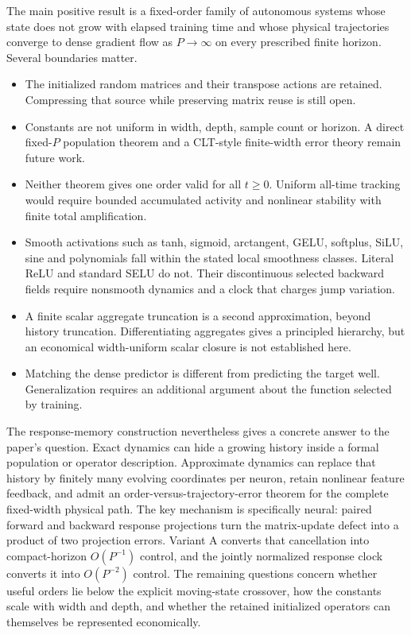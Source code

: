 \documentclass[11pt]{article}
\theoremstyle{definition}
\theoremstyle{remark}
\begin{document}
The main positive result is a fixed-order family of autonomous systems whose
state does not grow with elapsed training time and whose physical trajectories
converge to dense gradient flow as $P\to\infty$ on every prescribed finite
horizon.  Several boundaries matter.

\begin{itemize}
\item The initialized random matrices and their transpose actions are retained.
Compressing that source while preserving matrix reuse is still open.
\item Constants are not uniform in width, depth, sample count or horizon.  A
direct fixed-$P$ population theorem and a CLT-style finite-width error theory
remain future work.
\item Neither theorem gives one order valid for all $t\ge0$.  Uniform all-time
tracking would require bounded accumulated activity and nonlinear stability
with finite total amplification.
\item Smooth activations such as tanh, sigmoid, arctangent, GELU, softplus,
SiLU, sine and polynomials fall within the stated local smoothness classes.
Literal ReLU and standard SELU do not.  Their discontinuous selected backward
fields require nonsmooth dynamics and a clock that charges jump variation.
\item A finite scalar aggregate truncation is a second approximation, beyond
history truncation.  Differentiating aggregates gives a principled hierarchy,
but an economical width-uniform scalar closure is not established here.
\item Matching the dense predictor is different from predicting the target
well.  Generalization requires an additional argument about the function
selected by training.
\end{itemize}

The response-memory construction nevertheless gives a concrete answer to the
paper's question.  Exact dynamics can hide a growing history inside a formal
population or operator description.  Approximate dynamics can replace that
history by finitely many evolving coordinates per neuron, retain nonlinear
feature feedback, and admit an order-versus-trajectory-error theorem for the
complete fixed-width physical path.  The key mechanism is specifically neural:
paired forward and backward response projections turn the matrix-update defect
into a product of two projection errors.  Variant A converts that cancellation
into compact-horizon $O(P^{-1})$ control, and the jointly normalized response
clock converts it into $O(P^{-2})$ control.  The remaining questions concern
whether useful orders lie below the explicit moving-state crossover, how the
constants scale with width and depth, and whether the retained initialized
operators can themselves be represented economically.



\end{document}
